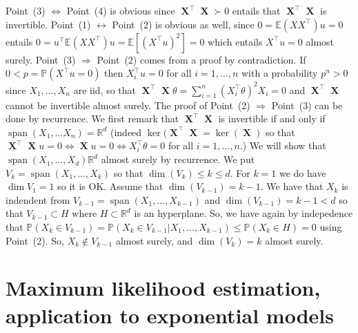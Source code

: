 \documentclass[
	fontsize=11pt, %
	twoside=false, %
	numbers=noenddot, %
]{kaobook}
\DeclareMathOperator{\bX}{{\boldsymbol X}}
\DeclareMathOperator*{\spa}{span}
\renewcommand{\P}{\mathbb P}
\newcommand{\E}{\mathbb E}
\newcommand{\R}{\mathbb R}
\begin{document}
Point~(3) $\Leftrightarrow$ Point~(4) is obvious since $\bX^\top \bX \succ 0$ entails that $\bX^\top \bX$ is invertible. Point~(1) $\leftrightarrow$ Point~(2) is obvious as well, since $0 = \E(X X^\top) u = 0$ entails $0 = u^\top \E(X X^\top) u = \E[ (X^\top u)^2] = 0$ which entails $X^\top u = 0$ almost surely. Point~(3) $\Rightarrow$ Point~(2) comes from a proof by contradiction. If $0 < p = \P(X^\top u = 0)$ then $X_i^\top u = 0$ for all $i=1, \ldots, n$ with a probability $p^n > 0$ since $X_1, \ldots, X_n$ are iid, so that $\bX^\top \bX \theta = \sum_{i=1}^n (X_i^\top \theta)^2 X_i = 0$ and $\bX^\top \bX$ cannot be invertible almost surely.
The proof of Point~(2) $\Rightarrow$ Point~(3) can be done by recurrence. We first remark that $\bX^\top \bX$ is invertible if and only if $\spa(X_1, \ldots X_n) = \R^d$ (indeed $\ker(\bX^\top \bX = \ker(\bX)$ so that $\bX^\top \bX u = 0 \Leftrightarrow \bX u = 0 \Leftrightarrow X_i^\top \theta = 0$ for all $i=1, \ldots, n$.) We will show that $\spa(X_1, \ldots, X_d) \R^d$ almost surely by recurrence. We put $V_k = \spa(X_1, \ldots, X_k)$ so that $\dim(V_k) \leq k \leq d$. For $k=1$ we do have $\dim V_1 = 1$ so it is OK. Assume that $\dim(V_{k-1}) = k-1$. We have that $X_k$ is indendent from $V_{k-1} = \spa(X_1, \ldots, X_{k-1})$ and $\dim(V_{k-1}) = k-1 < d$ so that $V_{k-1} \subset H$ where $H \subset \R^d$ is an hyperplane. So, we have again by indepedence that $\P(X_k \in V_{k-1}) = \P(X_k \in V_{k-1} | X_1, \ldots, X_{k-1}) \leq \P(X_k \in H) = 0$ using Point~(2). So, $X_k \notin V_{k-1}$ almost surely, and $\dim(V_k) = k$ almost surely.







\setchapterpreamble[u]{\margintoc}
\chapter{Maximum likelihood estimation, application to exponential models}
\label{chap:maximum_likelihood_estimation}




\printbibliography[heading=bibintoc, title=Bibliography] %
\end{document}
